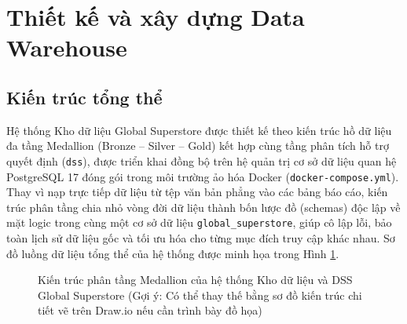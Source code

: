 \section{Thiết kế và xây dựng Data Warehouse}

\subsection{Kiến trúc tổng thể}

Hệ thống Kho dữ liệu Global Superstore được thiết kế theo kiến trúc hồ dữ liệu đa tầng Medallion (Bronze -- Silver -- Gold) kết hợp cùng tầng phân tích hỗ trợ quyết định (\texttt{dss}), được triển khai đồng bộ trên hệ quản trị cơ sở dữ liệu quan hệ PostgreSQL 17 đóng gói trong môi trường ảo hóa Docker (\texttt{docker-compose.yml}). Thay vì nạp trực tiếp dữ liệu từ tệp văn bản phẳng vào các bảng báo cáo, kiến trúc phân tầng chia nhỏ vòng đời dữ liệu thành bốn lược đồ (schemas) độc lập về mặt logic trong cùng một cơ sở dữ liệu \texttt{global\_superstore}, giúp cô lập lỗi, bảo toàn lịch sử dữ liệu gốc và tối ưu hóa cho từng mục đích truy cập khác nhau. Sơ đồ luồng dữ liệu tổng thể của hệ thống được minh họa trong Hình \ref{fig:dw_architecture}.

\begin{figure}[H]
\centering
{}
\caption{Kiến trúc phân tầng Medallion của hệ thống Kho dữ liệu và DSS Global Superstore (Gợi ý: Có thể thay thế bằng sơ đồ kiến trúc chi tiết vẽ trên Draw.io nếu cần trình bày đồ họa)}
\label{fig:dw_architecture}
\end{figure}

